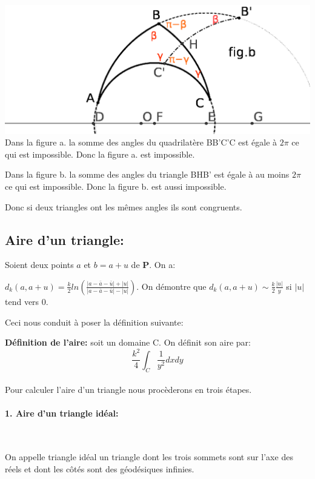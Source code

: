\documentclass[a4paper, 12pt, twoside]{book}
\begin{document}
 \includegraphics[scale=0.7]{figures/hyper15.eps} \\
 
 Dans la figure a. la somme des angles du quadrilatère BB'C'C est égale à $2\pi$ ce qui est impossible. Donc la figure a. est impossible.\
 
 Dans la figure b. la somme des angles du triangle BHB' est égale à au moins $2\pi$ ce qui est impossible. Donc la figure b. est aussi impossible.\ 
 
 Donc si deux triangles ont les mêmes angles ils sont congruents.\\
 
   
 \subsection{Aire d'un triangle:}
 
 Soient deux points $a$ et $b=a+u$ de \textbf{P}. On a:\
 
 $d_{k}(a,a+u)=\frac{k}{2}ln(\frac{|a-\bar{a}-\bar{u}|+|u|}{|a-\bar{a}-\bar{u}|-|u|})$. On démontre que $d_{k}(a,a+u)\sim \frac{k}{2}\frac{|u|}{y}$ si $|u|$ tend vers 0.\
 
 Ceci nous conduit à poser la définition suivante:\
 
 
 
 \textbf{Définition de l'aire:} soit un domaine C. On définit son aire par:
 $$\dfrac{k^{2}}{4}\int_{C}\dfrac{1}{y^{2}} dxdy$$\\
 
 Pour calculer l'aire d'un triangle nous procèderons en trois étapes.\\
 
 \paragraph{1. Aire d'un triangle idéal:}\
 
 On appelle triangle idéal un triangle dont les trois sommets sont sur l'axe des réels et dont les côtés sont des géodésiques infinies.\\
 
\end{document}
